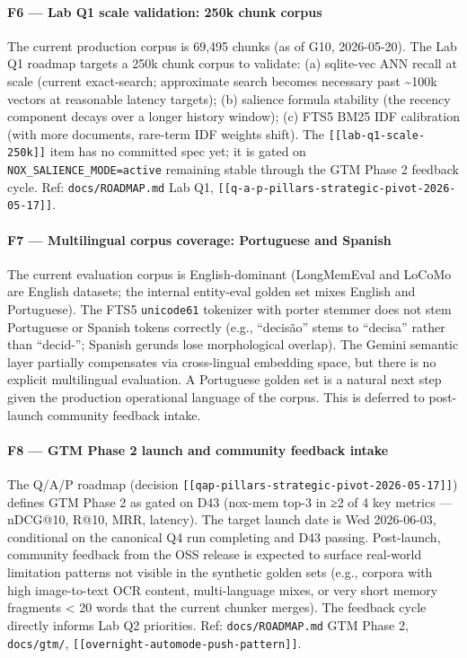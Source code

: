 \documentclass[
]{article}
\begin{document}
\paragraph{F6 --- Lab Q1 scale validation: 250k chunk
corpus}\label{f6-lab-q1-scale-validation-250k-chunk-corpus}

The current production corpus is 69,495 chunks (as of G10, 2026-05-20).
The Lab Q1 roadmap targets a 250k chunk corpus to validate: (a)
sqlite-vec ANN recall at scale (current exact-search; approximate search
becomes necessary past \textasciitilde100k vectors at reasonable latency
targets); (b) salience formula stability (the recency component decays
over a longer history window); (c) FTS5 BM25 IDF calibration (with more
documents, rare-term IDF weights shift). The
\texttt{{[}{[}lab-q1-scale-250k{]}{]}} item has no committed spec yet;
it is gated on \texttt{NOX\_SALIENCE\_MODE=active} remaining stable
through the GTM Phase 2 feedback cycle. Ref: \texttt{docs/ROADMAP.md}
Lab Q1, \texttt{{[}{[}q-a-p-pillars-strategic-pivot-2026-05-17{]}{]}}.

\paragraph{F7 --- Multilingual corpus coverage: Portuguese and
Spanish}\label{f7-multilingual-corpus-coverage-portuguese-and-spanish}

The current evaluation corpus is English-dominant (LongMemEval and
LoCoMo are English datasets; the internal entity-eval golden set mixes
English and Portuguese). The FTS5 \texttt{unicode61} tokenizer with
porter stemmer does not stem Portuguese or Spanish tokens correctly
(e.g., ``decisão'' stems to ``decisa'' rather than ``decid-''; Spanish
gerunds lose morphological overlap). The Gemini semantic layer partially
compensates via cross-lingual embedding space, but there is no explicit
multilingual evaluation. A Portuguese golden set is a natural next step
given the production operational language of the corpus. This is
deferred to post-launch community feedback intake.

\paragraph{F8 --- GTM Phase 2 launch and community feedback
intake}\label{f8-gtm-phase-2-launch-and-community-feedback-intake}

The Q/A/P roadmap (decision
\texttt{{[}{[}qap-pillars-strategic-pivot-2026-05-17{]}{]}}) defines GTM
Phase 2 as gated on D43 (nox-mem top-3 in ≥2 of 4 key metrics ---
nDCG@10, R@10, MRR, latency). The target launch date is Wed 2026-06-03,
conditional on the canonical Q4 run completing and D43 passing.
Post-launch, community feedback from the OSS release is expected to
surface real-world limitation patterns not visible in the synthetic
golden sets (e.g., corpora with high image-to-text OCR content,
multi-language mixes, or very short memory fragments \textless{} 20
words that the current chunker merges). The feedback cycle directly
informs Lab Q2 priorities. Ref: \texttt{docs/ROADMAP.md} GTM Phase 2,
\texttt{docs/gtm/},
\texttt{{[}{[}overnight-automode-push-pattern{]}{]}}.
\end{document}
